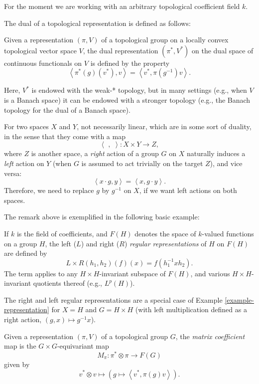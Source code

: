 For the moment we are working with an arbitrary topological coefficient field $k$.

The dual of a topological representation is defined as follows:
\begin{definition}
\label{definition-dual-representation}
Given a representation $(\pi, V)$ of a topological group on a locally convex topological vector space $V$, the dual representation $(\pi^*,V^*)$ on the dual space of continuous functionals on $V$ is defined by the property
 $$ \left< \pi^*(g)(v^*), v\right> = \left< v^*, \pi(g^{-1}) v\right>.$$
 
 Here, $V^*$ is endowed with the weak-* topology, but in many settings (e.g., when $V$ is a Banach space) it can be endowed with a stronger topology (e.g., the Banach topology for the dual of a Banach space). 
\end{definition}

\begin{remark}
\label{remark-spaces-induality}
 For two spaces $X$ and $Y$, not necessarily linear, which are in some sort of duality, in the sense that they come with a map 
 $$\left< \,\, , \,\, \right> : X\times Y\to Z,$$ 
 where $Z$ is another space, a \emph{right} action of a group $G$ on $X$ naturally induces a \emph{left} action on $Y$ (when $G$ is assumed to act trivially on the target $Z$), and vice versa:
 $$  \left< x\cdot g, y \right> = \left< x, g\cdot y \right>.$$
 Therefore, we need to replace $g$ by $g^{-1}$ on $X$, if we want left actions on both spaces.
\end{remark}

The remark above is exemplified in the following basic example:

\begin{definition}
 \label{definition-regular-representation}
If $k$ is the field of coefficients, and $F(H)$ denotes the space of $k$-valued functions on a group $H$, the left ($L$) and right ($R$) {\it regular representations} of $H$ on $F(H)$ are defined by 
$$ L \times R (h_1, h_2) (f) (x) = f(h_1^{-1} x h_2).$$
The term applies to any $H\times H$-invariant subspace of $F(H)$, and various $H\times H$-invariant quotients thereof (e.g., $L^p(H)$). 
\end{definition}

The right and left regular representations are a special case of Example \ref{example-representation} for $X=H$ and $G=H\times H$ (with left multiplication defined as a right action, $(g,x)\mapsto g^{-1}x$).

\begin{definition}
\label{definition-matrix-coefficient}
Given a representation $(\pi, V)$ of a topological group $G$, the {\it matrix coefficient} map is the $G\times G$-equivariant map 
$$M_\pi: \pi^* \otimes \pi \to F(G)$$
given by 
$$ v^*\otimes v \mapsto \left(g \mapsto \left< v^*, \pi(g) v\right> \right).$$
\end{definition}

